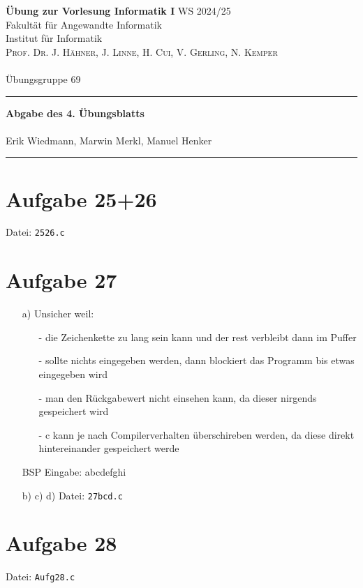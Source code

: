 \documentclass[paper=a4, %
         fontsize=10pt,  %
         oneside,        %
         headsepline,    %
         notitlepage     %
]{scrartcl}              %
\newcommand{\includecode}[1]{}
\newcommand{\includecodewithfilename}[1]{Datei: \texttt{#1}\vspace*{-1.5mm}\includecode{#1}}
\newcommand{\ownline}{\vspace{.7em}\hrule\vspace{.7em}}
\newcommand{\aufgabe}[1]{\section*{Aufgabe #1}}
\begin{document}
\textbf{Übung zur Vorlesung Informatik I} \hfill{WS 2024/25} \\  
Fakultät für Angewandte Informatik \\
Institut für Informatik \\
\textsc{Prof. Dr. J. Hähner, J. Linne, H. Cui, V. Gerling, N. Kemper} \\
\mbox{} \\
{\large Übungsgruppe 69} %
\ownline
\begin{center}
	{\LARGE \textbf{Abgabe des 4. Übungsblatts}} \\ %
	\mbox{} \\
	{\large Erik Wiedmann, Marwin Merkl, Manuel Henker} \\ %
\end{center}
\ownline



\aufgabe{25+26}
\includecodewithfilename{2526.c}

\aufgabe{27}
\begin{enumerate}
    \item[a)]
    Unsicher weil:
    \begin{enumerate}
            \item[-] die Zeichenkette zu lang sein kann und der rest verbleibt dann im Puffer
            \item[-] sollte nichts eingegeben werden, dann blockiert das Programm bis etwas eingegeben wird
            \item[-] man den Rückgabewert nicht einsehen kann, da dieser nirgends gespeichert wird
            \item[-] c kann je nach Compilerverhalten überschireben werden, da diese direkt hintereinander gespeichert werde 
    \end{enumerate}
    BSP Eingabe: abcdefghi
    \item[b) c) d)] \includecodewithfilename{27bcd.c}
\end{enumerate}

\aufgabe{28}
\includecodewithfilename{Aufg28.c}


\end{document}
